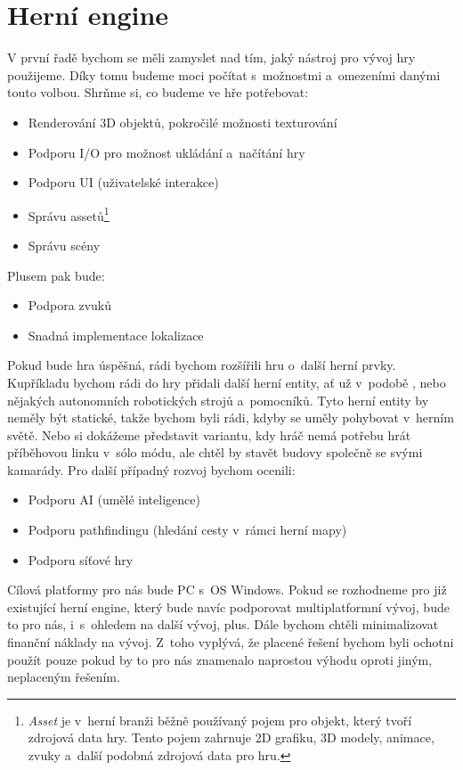 
\section{Herní engine}
V první řadě bychom se měli zamyslet nad tím, jaký nástroj pro vývoj hry použijeme. Díky tomu budeme moci počítat s~možnostmi a~omezeními danými touto volbou. Shrňme si, co budeme ve hře potřebovat:

\begin{itemize}
	\item Renderování 3D objektů, pokročilé možnosti texturování
	\item Podporu I/O pro možnost ukládání a~načítání hry
	\item Podporu UI (uživatelské interakce)
	\item Správu assetů\footnote{\textit{Asset} je v~herní branži běžně používaný pojem pro objekt, který tvoří zdrojová data hry. Tento pojem zahrnuje 2D grafiku, 3D modely, animace, zvuky a~další podobná zdrojová data pro hru.}
	\item Správu scény
\end{itemize}

Plusem pak bude:

\begin{itemize}
	\item Podpora zvuků
	\item Snadná implementace lokalizace
\end{itemize}

Pokud bude hra úspěšná, rádi bychom rozšířili hru o~další herní prvky. Kupříkladu bychom rádi do hry přidali další herní entity, ať už v~podobě \NPC{}, nebo nějakých autonomních robotických strojů a~pomocníků. Tyto herní entity by neměly být statické, takže bychom byli rádi, kdyby se uměly pohybovat v~herním světě. Nebo si dokážeme představit variantu, kdy hráč nemá potřebu hrát příběhovou linku v~sólo módu, ale chtěl by stavět budovy společně se svými kamarády. Pro další případný rozvoj bychom ocenili:

\begin{itemize}
	\item Podporu AI (umělé inteligence)
	\item Podporu pathfindingu (hledání cesty v~rámci herní mapy)
	\item Podporu síťové hry
\end{itemize}

Cílová platformy pro nás bude PC s~OS Windows. Pokud se rozhodneme pro již existující herní engine, který bude navíc podporovat multiplatformní vývoj, bude to pro nás, i~s~ohledem na další vývoj, plus. Dále bychom chtěli minimalizovat finanční náklady na vývoj. Z~toho vyplývá, že placené řešení bychom byli ochotni použít pouze pokud by to pro nás znamenalo naprostou výhodu oproti jiným, neplaceným řešením.

